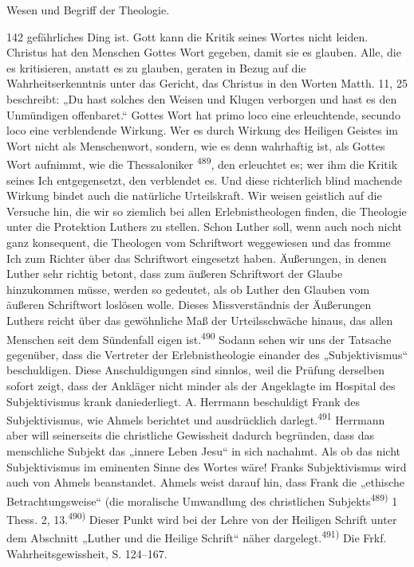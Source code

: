 \begin{center}Wesen und Begriff der Theologie.\end{center}\null\hfill 142 gefährliches Ding ist. Gott kann die Kritik seines Wortes nicht leiden. Christus hat den Menschen Gottes Wort gegeben, damit sie es glauben. Alle, die es kritisieren, anstatt es zu glauben, geraten in Bezug auf die Wahrheitserkenntnis unter das Gericht, das Christus in den Worten Matth. 11, 25 beschreibt: „Du hast solches den Weisen und Klugen verborgen und hast es den Unmündigen offenbaret.“ Gottes Wort hat primo loco eine erleuchtende, secundo loco eine verblendende Wirkung. Wer es durch Wirkung des Heiligen Geistes im Wort nicht als Menschenwort, sondern, wie es denn wahrhaftig ist, als Gottes Wort aufnimmt, wie die Thessaloniker \textsuperscript{489}, den erleuchtet es; wer ihm die Kritik seines Ich entgegensetzt, den verblendet es. Und diese richterlich blind machende Wirkung bindet auch die natürliche Urteilskraft. Wir weisen geistlich auf die Versuche hin, die wir so ziemlich bei allen Erlebnistheologen finden, die Theologie unter die Protektion Luthers zu stellen. Schon Luther soll, wenn auch noch nicht ganz konsequent, die Theologen vom Schriftwort weggewiesen und das fromme Ich zum Richter über das Schriftwort eingesetzt haben. Äußerungen, in denen Luther sehr richtig betont, dass zum äußeren Schriftwort der Glaube hinzukommen müsse, werden so gedeutet, als ob Luther den Glauben vom äußeren Schriftwort loslösen wolle. Dieses Missverständnis der Äußerungen Luthers reicht über das gewöhnliche Maß der Urteilsschwäche hinaus, das allen Menschen seit dem Sündenfall eigen ist.\textsuperscript{490} Sodann sehen wir uns der Tatsache gegenüber, dass die Vertreter der Erlebnistheologie einander des „Subjektivismus“ beschuldigen. Diese Anschuldigungen sind sinnlos, weil die Prüfung derselben sofort zeigt, dass der Ankläger nicht minder als der Angeklagte im Hospital des Subjektivismus krank daniederliegt. A. Herrmann beschuldigt Frank des Subjektivismus, wie Ahmels berichtet und ausdrücklich darlegt.\textsuperscript{491} Herrmann aber will seinerseits die christliche Gewissheit dadurch begründen, dass das menschliche Subjekt das „innere Leben Jesu“ in sich nachahmt. Als ob das nicht Subjektivismus im eminenten Sinne des Wortes wäre! Franks Subjektivismus wird auch von Ahmels beanstandet. Ahmels weist darauf hin, dass Frank die „ethische Betrachtungsweise“ (die moralische Umwandlung des christlichen Subjekts\vspace{2em}\noindent \textsuperscript{489)} 1 Thess. 2, 13.\noindent \textsuperscript{490)} Dieser Punkt wird bei der Lehre von der Heiligen Schrift unter dem Abschnitt „Luther und die Heilige Schrift“ näher dargelegt.\noindent \textsuperscript{491)} Die Frkf. Wahrheitsgewissheit, S. 124--167.